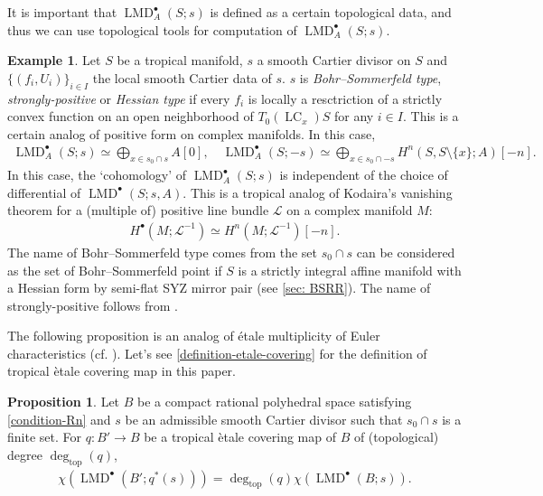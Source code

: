 \documentclass[a4paper,dvipdfmx,reqno,12pt]{amsart}
\theoremstyle{definition}
\newtheorem{example}[theorem]{Example}
\newtheorem{proposition}[theorem]{Proposition}
\newcommand{\mcal}[1]{\mathcal{#1}}%
\newcommand{\opn}[1]{\operatorname{#1}}
\numberwithin{equation}{section}
\begin{document}
It is important that $\opn{LMD}^{\bullet}_{A}(S;s)$ is
defined as a certain topological data, and thus
we can use topological tools for computation of 
$\opn{LMD}^{\bullet}_{A}(S;s)$.

\begin{example}
\label{example-tropical-kodaira-vanishing}
Let $S$ be a tropical manifold, 
$s$ a smooth Cartier divisor on $S$ 
and $\{(f_i,U_i)\}_{i\in I}$ the local smooth 
Cartier data of $s$. 
$s$ is 
\emph{Bohr--Sommerfeld type},
\emph{strongly-positive}
or \emph{Hessian type} if every
$f_i$ is locally a resctriction of a strictly convex 
function on an open neighborhood of $T_0(\opn{LC}_x)S$ 
for any $i\in I$. 
This is a certain analog of positive form on
complex manifolds. In this case, 
\begin{align}
\opn{LMD}^{\bullet}_{A}(S;s)\simeq 
\bigoplus_{x\in s_0 \cap s} A[0], \quad
\opn{LMD}^{\bullet}_{A}(S;-s)\simeq 
\bigoplus_{x\in s_0\cap -s} 
H^{n}(S,S\setminus\{x\};A)[-n].
\end{align}
In this case, the `cohomology' of 
$\opn{LMD}^{\bullet}_{A}(S;s)$ is independent of the choice of 
differential of $\opn{LMD}^{\bullet}(S;s,A)$.
This is a tropical analog of Kodaira's vanishing theorem
for a (multiple of) positive line bundle
$\mathcal{L}$ on a complex manifold $M$: 
\begin{align}
H^{\bullet}(M;\mcal{L}^{-1})\simeq H^{n}(M;\mcal{L}^{-1})[-n].
\end{align}
The name of Bohr--Sommerfeld type comes from 
the set $s_0\cap s$ can be considered as the set of 
Bohr--Sommerfeld point if $S$ is a strictly integral affine manifold 
with a Hessian form by semi-flat SYZ mirror pair
(see \cref{sec: BSRR}).
The name of strongly-positive follows 
from \cite{MR2892935}.
\end{example}

The following proposition is an analog of \'{e}tale multiplicity of Euler characteristics
(cf. \cite[Proposition 1.1.28]{MR2095471}).
Let's see \cref{definition-etale-covering} for 
the definition of tropical \`etale covering 
map in this paper.
\begin{proposition}
\label{proposition-euler-number-etale}
Let $B$ be a compact rational polyhedral space satisfying
\cref{condition-Rn} and $s$ be an admissible smooth Cartier divisor
such that $s_0\cap s$ is a finite set.
For $q \colon B' \to B$ be a tropical \`etale covering 
map of $B$ of 
(topological) degree 
$\opn{deg}_{\opn{top}}(q)$,
\begin{align}
\chi(\opn{LMD}^{\bullet}(B';q^{*}(s)))=
\opn{deg}_{\opn{top}}(q)\chi(\opn{LMD}^{\bullet}(B;s)).
\end{align}
\end{proposition}
\end{document}
